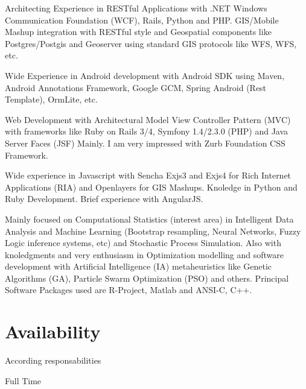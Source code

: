 \documentclass[11pt,letterpaper,roman]{moderncv}
\begin{document}
		{Architecting Experience in RESTful Applications with .NET Windows
		Communication Foundation (WCF), Rails, Python and PHP. GIS/Mobile Mashup
		integration with RESTful style and Geospatial components like Postgres/Postgis
		and Geoserver using standard GIS protocols like WFS, WFS, etc.}

		{Wide Experience in Android development with Android
		SDK using Maven, Android Annotations Framework, Google GCM, Spring Android (Rest Template), OrmLite, etc.}

		{Web Development with Architectural Model View
		Controller Pattern (MVC) with frameworks like Ruby on Rails 3/4, Symfony 1.4/2.3.0 (PHP) and Java Server Faces (JSF) Mainly. I am very impressed with Zurb Foundation CSS Framework.}

		{Wide experience in Javascript with Sencha
		Exjs3 and Exjs4 for Rich Internet Applications (RIA) and Openlayers for GIS
		Mashups. Knoledge in Python and Ruby Development. Brief experience with AngularJS.}

		{Mainly focused on Computational Statistics (interest area) in
		Intelligent Data Analysis and Machine Learning (Bootstrap resampling, Neural
		Networks, Fuzzy Logic inference systems, etc)  and Stochastic Process
		Simulation. Also with knoledgments and very enthusiasm in Optimization modelling
		and software development with Artificial Intelligence (IA) metaheuristics like
		Genetic Algorithms (GA), Particle Swarm Optimization (PSO) and others. Principal
		Software Packages used are R-Project, Matlab and ANSI-C, C++.}

\section{Availability}
	{According responsabilities}

	{Full Time}
\end{document}
